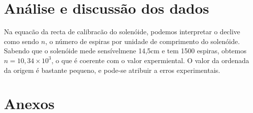 \documentclass[a4paper]{article}
\begin{document}
\section{Análise e discussão dos dados}

Na equacão da recta de calibracão do solenóide, podemos interpretar o declive como sendo $n$, o número de espiras por unidade de comprimento do solenóide. Sabendo que o solenóide mede sensívelmene 14,5cm e tem 1500 espiras, obtemos $n=10,34\times 10^3$, o que é coerente com o valor expermiental. O valor da ordenada da origem é bastante pequeno, e pode-se atribuir a erros experimentais.


\newpage
\section{Anexos}
\end{document}

